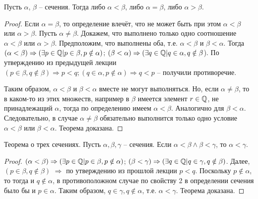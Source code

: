 \documentclass[main]{subfiles}
\begin{document}
\begin{theorem}
    Пусть $\alpha$, $\beta$ -- сечения. Тогда либо $\alpha < \beta$, либо
    $\alpha = \beta$, либо $\alpha > \beta$.
\end{theorem}
\begin{proof}
    Если $\alpha = \beta$, то определение влечёт, что не может быть при этом
    $\alpha < \beta$ или $\alpha > \beta$. Пусть $\alpha \neq \beta$. Докажем,
    что выполнено только одно соотношение $\alpha < \beta$ или $\alpha > \beta$.
    Предположим, что выполнены оба, т.е. $\alpha < \beta$ и $\beta < \alpha$.
    Тогда $(\alpha < \beta) \Rightarrow (\exists p \in \mathbb{Q} |
        p \in \beta, p \notin \alpha)$; $(\beta < \alpha) \Rightarrow
        (\exists q \in \mathbb{Q} | q \in \alpha, q \notin \beta$).
    По утверждению из предыдущей лекции $(p \in \beta, q \notin \beta) \Rightarrow
        p < q; (q \in \alpha, p \notin \alpha) \Rightarrow q < p$ -- получили
    противоречие.

    Таким образом, $\alpha < \beta$ и $\beta < \alpha$ вместе не могут выполняться.
    Но, если $\alpha \neq \beta$, то в каком-то из этих множеств, например в
    $\beta$ имеется элемент $r \in \mathbb{Q}$, не принадлежащий $\alpha$,
    тогда по определению имеем $\alpha < \beta$. Аналогично для $\beta < \alpha$.
    Следовательно, в случае $\alpha \neq \beta$ обязательно выполнится только
    одно условие $\alpha < \beta$ или $\beta < \alpha$. Теорема доказана.
\end{proof}

\begin{theorem}
    Теорема о трех сечениях. Пусть $\alpha, \beta, \gamma$ -- сечения.
    Если $\alpha < \beta \wedge \beta < \gamma$, то $\alpha < \gamma$.
\end{theorem}
\begin{proof}
    $(\alpha < \beta) \Rightarrow (\exists p \in \mathbb{Q} | p \in \beta, p \notin \alpha)$;
    $(\beta < \gamma) \Rightarrow (\exists q \in \mathbb{Q} | q \in \gamma, q \notin \beta)$.
    Далее, $(p \in \beta, q \notin \beta)$ $\Rightarrow$ по утверждению из прошлой лекции
    $p < q$. Поскольку $p \notin \alpha$, то тогда и $q \notin \alpha$,
    в противоположном случае по свойству 2 в определении сечения было бы и $p \in \alpha$.
    Таким образом, $q \in \gamma, q \notin \alpha$, т.е. $\alpha < \gamma$.
    Теорема доказана.
\end{proof}
\end{document}
